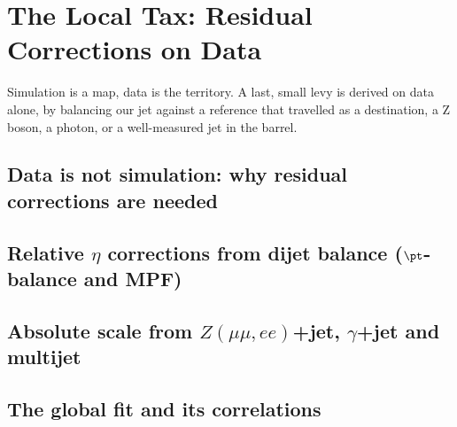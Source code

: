 \chapter{The Local Tax: Residual Corrections on Data}
\label{ch:local_tax}

\begin{journeybox}
Simulation is a map, data is the territory. A last, small levy is derived on
data alone, by balancing our jet against a reference that travelled as a
destination, a Z boson, a photon, or a well-measured jet in the barrel.
\end{journeybox}


\section{Data is not simulation: why residual corrections are needed}
\label{sec:local_tax:data_is_not_simulation_why_residual_corr}

\section{Relative $\eta$ corrections from dijet balance ($\pt$-balance and MPF)}
\label{sec:local_tax:relative_eta_corrections_from_dijet_bala}

\section{Absolute scale from $Z(\mu\mu,ee)$+jet, $\gamma$+jet and multijet}
\label{sec:local_tax:absolute_scale_from_z_mumu_ee_jet_gamma_}

\section{The global fit and its correlations}
\label{sec:local_tax:the_global_fit_and_its_correlations}

